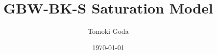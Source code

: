 \documentclass[12pt]{article}
\begin{document}
	
\author{Tomoki Goda}
\title{GBW-BK-S Saturation Model \cite{gbw1998} }
\date{\today}



%
%


\newpage
\printbibliography
\end{document}
